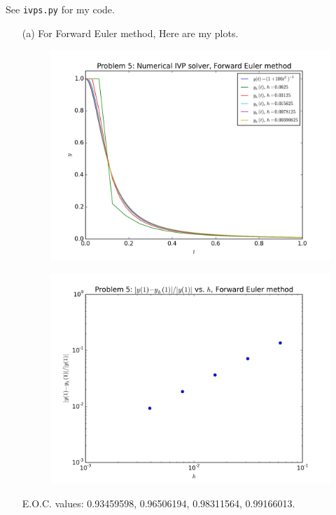 \documentclass[10pt]{article}
\begin{document}
See \verb+ivps.py+ for my code.

\begin{itemize}

\item[(a)] For Forward Euler method,  Here are my plots.

\begin{figure}[H]
  \centering
    \includegraphics[scale=0.6]{ivp_sol_f}
\end{figure}

\begin{figure}[H]
  \centering
    \includegraphics[scale=0.6]{ivp_err_f}
\end{figure}

E.O.C. values: 0.93459598,  0.96506194,  0.98311564,  0.99166013.


\end{itemize}
\end{document}
